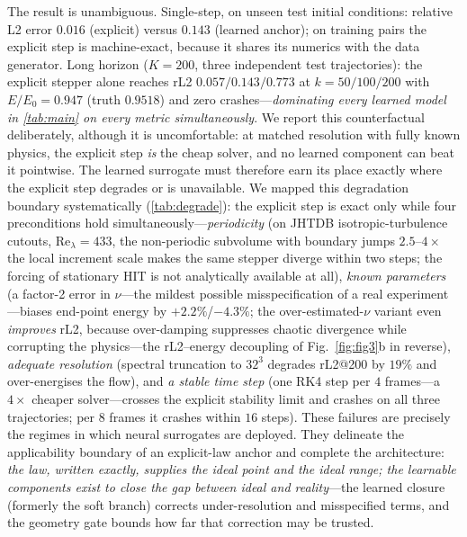 \documentclass[11pt,a4paper]{article}
\begin{document}
The result is unambiguous. Single-step, on unseen test initial conditions: relative L2 error $0.016$ (explicit) versus $0.143$ (learned anchor); on training pairs the explicit step is machine-exact, because it shares its numerics with the data generator. Long horizon ($K{=}200$, three independent test trajectories): the explicit stepper alone reaches rL2 $0.057/0.143/0.773$ at $k{=}50/100/200$ with $E/E_0{=}0.947$ (truth $0.9518$) and zero crashes---\emph{dominating every learned model in \ref{tab:main} on every metric simultaneously}. We report this counterfactual deliberately, although it is uncomfortable: at matched resolution with fully known physics, the explicit step \emph{is} the cheap solver, and no learned component can beat it pointwise. The learned surrogate must therefore earn its place exactly where the explicit step degrades or is unavailable. We mapped this degradation boundary systematically (\ref{tab:degrade}): the explicit step is exact only while four preconditions hold simultaneously---\emph{periodicity} (on JHTDB isotropic-turbulence cutouts, Re$_\lambda{=}433$, the non-periodic subvolume with boundary jumps $2.5$--$4\times$ the local increment scale makes the same stepper diverge within two steps; the forcing of stationary HIT is not analytically available at all), \emph{known parameters} (a factor-2 error in $\nu$---the mildest possible misspecification of a real experiment---biases end-point energy by $+2.2\%$/$-4.3\%$; the over-estimated-$\nu$ variant even \emph{improves} rL2, because over-damping suppresses chaotic divergence while corrupting the physics---the rL2--energy decoupling of Fig.~\ref{fig:fig3}b in reverse), \emph{adequate resolution} (spectral truncation to $32^3$ degrades rL2@200 by $19\%$ and over-energises the flow), and \emph{a stable time step} (one RK4 step per $4$ frames---a $4\times$ cheaper solver---crosses the explicit stability limit and crashes on all three trajectories; per $8$ frames it crashes within $16$ steps). These failures are precisely the regimes in which neural surrogates are deployed. They delineate the applicability boundary of an explicit-law anchor and complete the architecture: \emph{the law, written exactly, supplies the ideal point and the ideal range; the learnable components exist to close the gap between ideal and reality}---the learned closure (formerly the soft branch) corrects under-resolution and misspecified terms, and the geometry gate bounds how far that correction may be trusted.
\end{document}
